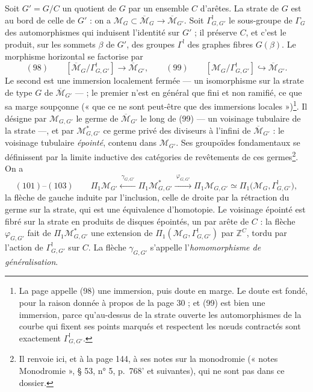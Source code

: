 \documentclass[11pt,a4paper]{article}
\begin{document}
Soit $G' = G/C$ un quotient de $G$ par un ensemble $C$ d'arêtes. La strate de
$G$ est au bord de celle de $G'$ : on a $\mathcal{M}_G \subset
\overline{\mathcal{M}}_G \to \overline{\mathcal{M}}_{G'}$. Soit
$\Gamma^{!}_{G,G'}$ le sous-groupe de $\Gamma_G$ des automorphismes qui
induisent l'identité sur $G'$ ; il préserve $C$, et c'est le produit, sur les
sommets $\beta$ de $G'$, des groupes $\Gamma^{!}$ des graphes fibres $G(\beta)$.
Le morphisme horizontal se factorise par
\[
(98) \qquad [\overline{\mathcal{M}}_G/\Gamma^{!}_{G,G'}] \longrightarrow
\overline{\mathcal{M}}_{G'}, \qquad (99) \qquad [\mathcal{M}_G/\Gamma^{!}_{G,G'}]
\hookrightarrow \overline{\mathcal{M}}_{G'} .
\]
Le second est une immersion localement fermée — un isomorphisme sur la strate de
type $G$ de $\overline{\mathcal{M}}_{G'}$ — ; le premier n'est en général que fini
et non ramifié, ce que sa marge soupçonne (« que ce ne sont peut-être que des
immersions locales »)\footnote{La page appelle (98) une immersion, puis doute en
marge. Le doute est fondé, pour la raison donnée à propos de la page 30 ; et
(99) est bien une immersion, parce qu'au-dessus de la strate ouverte les
automorphismes de la courbe qui fixent ses points marqués et respectent les
nœuds contractés sont exactement $\Gamma^{!}_{G,G'}$.}. Il désigne par
$\mathcal{M}_{G,G'}$ le germe de $\overline{\mathcal{M}}_{G'}$ le long de (99) —
un voisinage tubulaire de la strate —, et par $\mathcal{M}^{*}_{G,G'}$ ce germe
privé des diviseurs à l'infini de $\overline{\mathcal{M}}_{G'}$ : le voisinage
tubulaire \emph{épointé}, contenu dans $\mathcal{M}_{G'}$. Ses groupoïdes
fondamentaux se définissent par la limite inductive des catégories de revêtements
de ces germes\footnote{Il renvoie ici, et à la page 144, à ses notes sur la
monodromie (« notes Monodromie », § 53, n° 5, p.~768' et suivantes), qui ne sont
pas dans ce dossier.}. On a
\[
(101)\text{--}(103) \qquad \Pi_1 \mathcal{M}_{G'} \xleftarrow{\ \gamma_{G,G'}\ }
\Pi_1 \mathcal{M}^{*}_{G,G'} \xrightarrow{\ \varphi_{G,G'}\ } \Pi_1
\mathcal{M}_{G,G'} \simeq \Pi_1\bigl(\mathcal{M}_G, \Gamma^{!}_{G,G'}\bigr),
\]
la flèche de gauche induite par l'inclusion, celle de droite par la rétraction
du germe sur la strate, qui est une équivalence d'homotopie. Le voisinage épointé
est fibré sur la strate en produits de disques épointés, un par arête de $C$ : la
flèche $\varphi_{G,G'}$ fait de $\Pi_1 \mathcal{M}^{*}_{G,G'}$ une extension de
$\Pi_1(\mathcal{M}_G, \Gamma^{!}_{G,G'})$ par $\mathbb{Z}^C$, tordu par l'action
de $\Gamma^{!}_{G,G'}$ sur $C$. La flèche $\gamma_{G,G'}$ s'appelle
l'\emph{homomorphisme de généralisation}.
\end{document}
